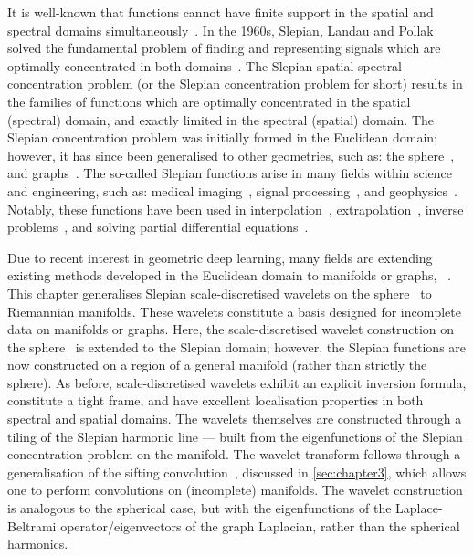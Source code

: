 It is well-known that functions cannot have finite support in the spatial and spectral domains simultaneously~\cite{Slepian1961,Slepian1983}.
In the 1960s, Slepian, Landau and Pollak solved the fundamental problem of finding and representing signals which are optimally concentrated in both domains~\cite{Slepian1961,Landau1961,Landau1962}.
The Slepian spatial-spectral concentration problem (or the Slepian concentration problem for short) results in the families of functions which are optimally concentrated in the spatial (spectral) domain, and exactly limited in the spectral (spatial) domain.
The Slepian concentration problem was initially formed in the Euclidean domain; however, it has since been generalised to other geometries, such as: the sphere~\cite{Simons2006,Wieczorek2005,Albertella1999,Cohen1989,Meaney1984,Daubechies1988}, and graphs~\cite{VanDeVille2017,VanDeVille2017a,Bolton2018}.
The so-called Slepian functions arise in many fields within science and engineering, such as: medical imaging~\cite{Jackson1991}, signal processing~\cite{Mathews1985,Thomson1982}, and geophysics~\cite{Thomson1976,Simons2006a,Simons2011}.
Notably, these functions have been used in interpolation~\cite{Moore2004,Shkolnisky2006}, extrapolation~\cite{Xu1983}, inverse problems~\cite{Villiers2001,Abdelmoula2015}, and solving partial differential equations~\cite{Boyd2003,Chen2005}.

Due to recent interest in geometric deep learning, many fields are extending existing methods developed in the Euclidean domain to manifolds or graphs, \ie{}~\cite{Perlmutter2020}.
This chapter generalises Slepian scale-discretised wavelets on the sphere~\cite{Roddy2021a} to Riemannian manifolds.
These wavelets constitute a basis designed for incomplete data on manifolds or graphs.
Here, the scale-discretised wavelet construction on the sphere~\cite{Wiaux2008,McEwen2018,Leistedt2013,McEwen2013,McEwen2015} is extended to the Slepian domain; however, the Slepian functions are now constructed on a region of a general manifold (rather than strictly the sphere).
As before, scale-discretised wavelets exhibit an explicit inversion formula, constitute a tight frame, and have excellent localisation properties in both spectral and spatial domains.
The wavelets themselves are constructed through a tiling of the Slepian harmonic line --- built from the eigenfunctions of the Slepian concentration problem on the manifold.
The wavelet transform follows through a generalisation of the sifting convolution~\cite{Roddy2021}, discussed in \cref{sec:chapter3}, which allows one to perform convolutions on (incomplete) manifolds.
The wavelet construction is analogous to the spherical case, but with the eigenfunctions of the Laplace-Beltrami operator/eigenvectors of the graph Laplacian, rather than the spherical harmonics.

